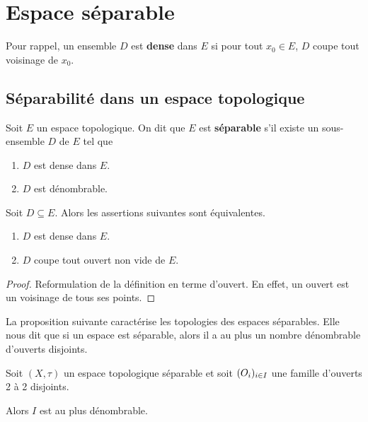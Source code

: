 \chapter{Espace séparable}

Pour rappel, un ensemble $D$ est \textbf{dense} dans $E$ si pour tout $x_{0} \in E$, $D$
coupe tout voisinage de $x_{0}$.

\section{Séparabilité dans un espace topologique}

\begin{definition}
	Soit $E$ un espace topologique.
	On dit que $E$ est \textbf{séparable} s'il existe un sous-ensemble $D$ de
	$E$ tel que
	\begin{enumerate}
		\item $D$ est dense dans $E$.
		\item $D$ est dénombrable.
	\end{enumerate}
\end{definition}

\begin{proposition}
	Soit $D \subseteq E$.
	Alors les assertions suivantes sont équivalentes.
	\begin{enumerate}
		\item $D$ est dense dans $E$.
		\item $D$ coupe tout ouvert non vide de $E$.
	\end{enumerate}
\end{proposition}

\ifdefined\outputproof
\begin{proof}
	Reformulation de la définition en terme d'ouvert. En effet, un ouvert est un
	voisinage de tous ses points.
\end{proof}
\fi

La proposition suivante caractérise les topologies des espaces séparables. Elle
nous dit que si un espace est séparable, alors il a au plus un nombre
dénombrable d'ouverts disjoints.

\begin{proposition}
	Soit $(X, \tau)$ un espace topologique séparable et soit $(O_{i})_{i \in I}$ une famille d'ouverts
	2 à 2 disjoints.

	Alors $I$ est au plus dénombrable.
\end{proposition}

